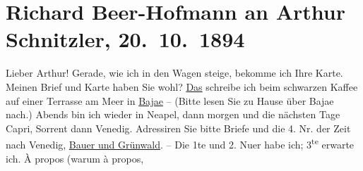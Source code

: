 

         
         \renewcommand{\erwaehntePersonen}{Personen: Hermann Bahr, Max Eugen Burckhard, Guy de Maupassant}
         \renewcommand{\erwaehnteInstitutionen}{Institutionen: Deutscher Schulverein, Die Zeit. Wiener Wochenschrift}
         \renewcommand{\erwaehnteOrte}{Orte: Baia, Capri, Grand Hotel Bauer-Grünwald, Neapel, Pallanza, Prag, Sorrent, Venedig, Wien}
         \renewcommand{\erwaehnteWerke}{Werke: Der Abonnent, Die Schmetterlingsschlacht. Komödie in 4 Akten, Die Zeit. Wiener Wochenschrift, Dora}
               \section[Richard Beer-Hofmann an Arthur Schnitzler, 20. 10. 1894]{ Richard Beer-Hofmann an Arthur Schnitzler, 20. 10. 1894}\nopagebreak{}\rehead{ }\begin{ledgroupsized}[t]{13cm}\normalsize\beginnumbering \toendnotes[C]{\smallbreak\pagebreak[2]} 
\toendnotes[C]{\smallbreak}\pstart
           \noindent{}{\pb}Lieber Arthur!
                    Gerade, wie ich in den Wagen steige, bekomme ich Ihre Karte. Meinen
                    Brief  und Karte haben Sie wohl?\pend
           \pstart
           \uline{Das}
               schreibe ich beim schwarzen Kaffee auf einer
                    Terrasse am Meer in \uline{Bajae} – (Bitte lesen Sie zu Hause über Bajae
                    nach.) Abends bin ich wieder in Neapel, dann
                    morgen und die nächsten Tage Capri,
                        Sorrent dann Venedig. Adressiren Sie bitte Briefe und die 4. Nr. der
                        Zeit nach Venedig,
                            \uline{Bauer und Grünwald}. – Die 1te und 2. Nu{\geminationm}er habe ich; 3\textsuperscript{te} erwarte ich. {\pb}À propos (warum à propos,

\end{ledgroupsized}

